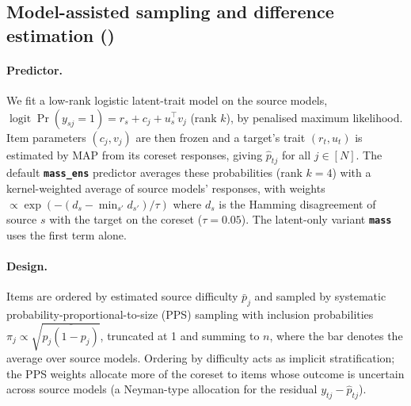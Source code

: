 \subsection{Model-assisted sampling and difference estimation (\mass)}
\label{sec:mass}
\paragraph{Predictor.}
We fit a low-rank logistic latent-trait model on the source models, $\operatorname{logit}\Pr(y_{sj}=1)=r_s+c_j+u_s^\top v_j$ (rank $k$), by penalised maximum likelihood. Item parameters $(c_j,v_j)$ are then frozen and a target's trait $(r_t,u_t)$ is estimated by MAP from its coreset responses, giving $\hat p_{tj}$ for all $j\in[N]$.
The default \textbf{\texttt{mass\_ens}} predictor averages these probabilities (rank $k=4$) with a kernel-weighted average of source models' responses, with weights $\propto\exp(-(d_s-\min_{s'}d_{s'})/\tau)$ where $d_s$ is the Hamming disagreement of source $s$ with the target on the coreset ($\tau=0.05$). The latent-only variant \textbf{\texttt{mass}} uses the first term alone.

\paragraph{Design.}
Items are ordered by estimated source difficulty $\bar p_j$ and sampled by systematic probability-proportional-to-size (PPS) sampling with inclusion probabilities $\pi_j\propto\sqrt{\overline{p_j(1-p_j)}}$, truncated at 1 and summing to $n$, where the bar denotes the average over source models. Ordering by difficulty acts as implicit stratification; the PPS weights allocate more of the coreset to items whose outcome is uncertain across source models (a Neyman-type allocation for the residual $y_{tj}-\hat p_{tj}$).

